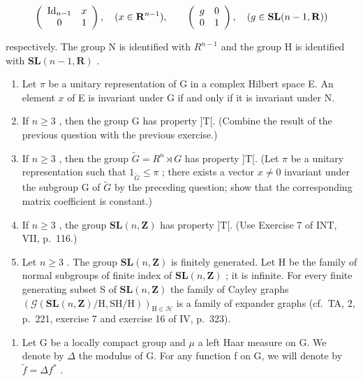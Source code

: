 \[
\left( \begin{array}{c c} \operatorname{Id} _ {n - 1} & x \\ 0 & 1 \end{array} \right), \quad (x \in \mathbf {R} ^ {n - 1}), \qquad \left( \begin{array}{c c} g & 0 \\ 0 & 1 \end{array} \right), \quad (g \in \mathbf {S L} (n - 1, \mathbf {R}))
\]

respectively. The group N is identified with \(R^{n-1}\) and the group H is identified with \(\mathbf{SL}(n-1,\mathbf{R})\) .

\begin{enumerate}
\def\labelenumi{\alph{enumi})}
\item
  Let \(\pi\) be a unitary representation of G in a complex Hilbert space E. An element \(x\) of E is invariant under G if and only if it is invariant under N.
\item
  If \(n \geqslant 3\) , then the group G has property ]T[. (Combine the result of the previous question with the previous exercise.)
\item
  If \(n \geqslant 3\) , then the group \(\widetilde{G} = R^{n} \rtimes G\) has property ]T[. (Let \(\pi\) be a unitary representation such that \(1_{\widetilde{G}} \leqslant \pi\) ; there exists a vector \(x \neq 0\) invariant under the subgroup G of \(\widetilde{G}\) by the preceding question; show that the corresponding matrix coefficient is constant.)
\item
  If \(n \geqslant 3\) , the group \(\mathbf{SL}(n, \mathbf{Z})\) has property ]T[. (Use Exercise 7 of INT, VII, p.~116.)
\item
  Let \(n \geqslant 3\) . The group \(\mathbf{SL}(n, \mathbf{Z})\) is finitely generated. Let H be the family of normal subgroups of finite index of \(\mathbf{SL}(n, \mathbf{Z})\) ; it is infinite. For every finite generating subset S of \(\mathbf{SL}(n, \mathbf{Z})\) the family of Cayley graphs \((\mathcal{G}(\mathbf{SL}(n, \mathbf{Z})/\mathrm{H}, \mathrm{SH}/\mathrm{H}))_{\mathrm{H} \in \mathcal{H}}\) is a family of expander graphs (cf.~TA, 2, p.~221, exercise 7 and exercise 16 of IV, p.~323).
\end{enumerate}

\begin{enumerate}
\def\labelenumi{\arabic{enumi})}
\setcounter{enumi}{19}
\tightlist
\item
  Let G be a locally compact group and \(\mu\) a left Haar measure on G. We denote by \(\Delta\) the modulus of G. For any function f on G, we will denote by \(\widetilde{f} = \Delta f^{*}\) .
\end{enumerate}

